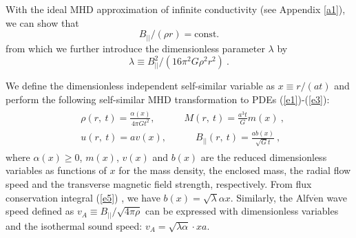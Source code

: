 \documentclass[fleqn,usenatbib]{mnras}
\begin{document}

With the ideal MHD approximation of infinite conductivity (see Appendix \ref{a1}), we can show that \citep{yuLou2006} %
\begin{equation}
B_{||}/(\rho r)=\mathrm{const.}\label{e4}
\end{equation}
from which we further introduce the dimensionless
 parameter $\lambda$ by
\begin{equation}
\lambda\equiv B^{2}_{||}/
  \left(16\pi^{2}G\rho^{2} r^{2}\right)\ .\label{e5}
\end{equation}

We define the dimensionless independent self-similar variable as $x\equiv r/(at)$ and perform the following self-similar MHD transformation to PDEs (\ref{e1})-(\ref{e3}):
\begin{gather}
\begin{split}
&\rho(r,\ t)=\frac{\alpha(x)}{4\pi Gt^{2}},
 \qquad\quad M(r,\ t)=\frac{a^{3}t}{G}m(x)\ ,\\
&u(r,\ t)=av(x), \qquad\quad B_{||}(r,\ t)=\frac{ab(x)}{\sqrt{G}t}\ ,
\end{split}\label{e6}
\end{gather}
where $\alpha(x)\geq 0$, $m(x)$, $v(x)$ and $b(x)$ are the reduced dimensionless variables as functions of $x$ for the mass density, the enclosed mass, the radial flow speed and the transverse magnetic field strength, respectively. From flux conservation integral (\ref{e5}) , we have $b(x)=\sqrt{\lambda}\alpha x$. Similarly, the $\text{Alfv}\mathrm{\acute{e}}\text{n}$ wave speed defined as $v_{A}\equiv B_{||}/\sqrt{4\pi\rho}$ can be expressed with dimensionless variables and the isothermal sound speed: $v_{A}=\sqrt{\lambda\alpha}\cdot xa$.
\end{document}
